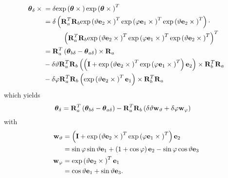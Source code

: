 \documentclass[10pt,dvips,fleqn,subeqn]{report}
\newcommand{\T}[1]{\bm{\mathbf{#1}}}
\begin{document}
\begin{align}
	\T{\theta}_{\delta}\times{}
	&= \delta \llk{exp}\plbr{\T{\theta}\times{}}
		\llk{exp}\plbr{\T{\theta}\times{}}^T \nonumber \\
	&= \delta \plbr{
		\T{R}_a^T
		\T{R}_b
		\llk{exp}\plbr{\vartheta \T{e}_2\times{}}^T
		\llk{exp}\plbr{\varphi \T{e}_1\times{}}^T
		\llk{exp}\plbr{\vartheta \T{e}_2\times{}}^T
	} \cdot \nonumber \\
	&\mbox{\hspace{10mm}} \plbr{
		\T{R}_a^T
		\T{R}_b
		\llk{exp}\plbr{\vartheta \T{e}_2\times{}}^T
		\llk{exp}\plbr{\varphi \T{e}_1\times{}}^T
		\llk{exp}\plbr{\vartheta \T{e}_2\times{}}^T
	}^T \nonumber \\
	&= \T{R}_a^T
	\plbr{\T{\theta}_{b\delta} - \T{\theta}_{a\delta}}\times{} \T{R}_a
	\nonumber \\
	& \mbox{} -
	\delta\vartheta \T{R}_a^T \T{R}_b \plbr{
		\plbr{
			\T{I}
			+ \llk{exp}\plbr{\vartheta \T{e}_2\times{}}^T
			\llk{exp}\plbr{\varphi \T{e}_1\times{}}^T
		} \T{e}_2
	}\times \T{R}_b^T \T{R}_a
	\nonumber \\
	& \mbox{} -
	\delta\varphi \T{R}_a^T \T{R}_b \plbr{
		\llk{exp}\plbr{\vartheta \T{e}_2\times{}}^T \T{e}_1
	} \times \T{R}_b^T \T{R}_a
\end{align}
which yields
\begin{align}
	\T{\theta}_{\delta}
	&= \T{R}_a^T \plbr{\T{\theta}_{b\delta} - \T{\theta}_{a\delta}}
	- \T{R}_a^T \T{R}_b \plbr{
		\delta\vartheta \T{w}_{\vartheta}
		+ \delta\varphi \T{w}_{\varphi}
	}
\end{align}
with
\begin{subequations}
\begin{align}
	\T{w}_{\vartheta}
	&= \plbr{
		\T{I}
		+ \llk{exp}\plbr{\vartheta \T{e}_2\times{}}^T
		\llk{exp}\plbr{\varphi \T{e}_1\times{}}^T
	} \T{e}_2
	\nonumber \\
	&= \sin\varphi \sin\vartheta \T{e}_1
	+ \plbr{1 + \cos\varphi} \T{e}_2
	- \sin\varphi \cos\vartheta \T{e}_3 \\
	\T{w}_{\varphi}
	&= \llk{exp}\plbr{\vartheta \T{e}_2\times{}}^T \T{e}_1
	\nonumber \\
	&= \cos\vartheta \T{e}_1 + \sin\vartheta \T{e}_3 .
\end{align}
\end{subequations}
\end{document}
